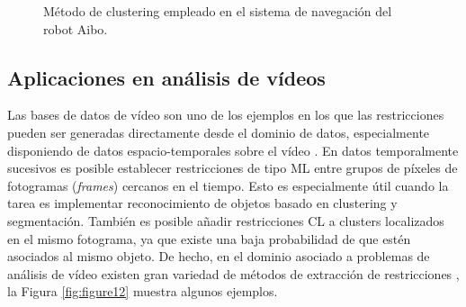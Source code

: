 \begin{figure}[bth]
	\myfloatalign
	 \quad
	 \quad
	 \quad
	\caption[Método de clustering empleado en el sistema de navegación del robot Aibo.]{Método de clustering empleado en el sistema de navegación del robot Aibo. \cite{Survey:2007}\cite{DavidsonRavi:2005a}}\label{fig:figure11}
\end{figure}

\subsection{Aplicaciones en análisis de vídeos}

Las bases de datos de vídeo son uno de los ejemplos en los que las restricciones pueden ser generadas directamente desde el dominio de datos, especialmente disponiendo de datos espacio-temporales sobre el vídeo \cite{Yan:2006}. En datos temporalmente sucesivos es posible establecer restricciones de tipo \acf{ML} entre grupos de píxeles de fotogramas (\textit{frames}) cercanos en el tiempo. Esto es especialmente útil cuando la tarea es implementar reconocimiento de objetos basado en clustering y segmentación. También es posible añadir restricciones \acf{CL} a clusters localizados en el mismo fotograma, ya que existe una baja probabilidad de que estén asociados al mismo objeto. De hecho, en el dominio asociado a problemas de análisis de vídeo existen gran variedad de métodos de extracción de restricciones \cite{Yan:2006}, la Figura \ref{fig:figure12} muestra algunos ejemplos.  

